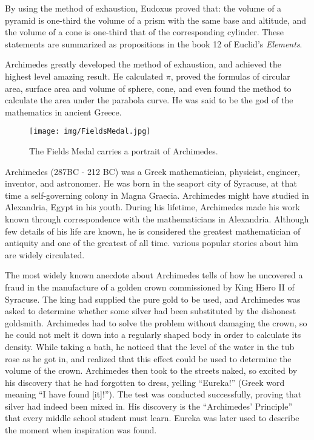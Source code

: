 \documentclass{article}
\begin{document}
By using the method of exhaustion, Eudoxus proved that: the volume of a pyramid is one-third the volume of a prism with the same base and altitude, and the volume of a cone is one-third that of the corresponding cylinder. These statements are summarized as propositions in the book 12 of Euclid's {\em Elements}\cite{HanXueTao16}.

Archimedes greatly developed the method of exhaustion, and achieved the highest level amazing result. He calculated $\pi$, proved the formulas of circular area, surface area and volume of sphere, cone, and even found the method to calculate the area under the parabola curve. He was said to be the god of the mathematics in ancient Greece.

\begin{wrapfigure}{R}{0.4\textwidth}
 \centering
 \texttt{[image: img/FieldsMedal.jpg]}
 \captionsetup{labelformat=empty}
 \caption{The Fields Medal carries a portrait of Archimedes.}
 \label{fig:FieldsMedal}
\end{wrapfigure}

Archimedes (287BC - 212 BC) was a Greek mathematician, physicist, engineer, inventor, and astronomer. He was born in the seaport city of Syracuse, at that time a self-governing colony in Magna Graecia. Archimedes might have studied in Alexandria, Egypt in his youth. During his lifetime, Archimedes made his work known through correspondence with the mathematicians in Alexandria. Although few details of his life are known, he is considered the greatest mathematician of antiquity and one of the greatest of all time. various popular stories about him are widely circulated.

The most widely known anecdote about Archimedes tells of how he uncovered a fraud in the manufacture of a golden crown commissioned by King Hiero II of Syracuse. The king had supplied the pure gold to be used, and Archimedes was asked to determine whether some silver had been substituted by the dishonest goldsmith. Archimedes had to solve the problem without damaging the crown, so he could not melt it down into a regularly shaped body in order to calculate its density. While taking a bath, he noticed that the level of the water in the tub rose as he got in, and realized that this effect could be used to determine the volume of the crown. Archimedes then took to the streets naked, so excited by his discovery that he had forgotten to dress, yelling ``Eureka!'' (Greek word meaning ``I have found [it]!''). The test was conducted successfully, proving that silver had indeed been mixed in. His discovery is the ``Archimedes' Principle'' that every middle school student must learn. Eureka was later used to describe the moment when inspiration was found.
\end{document}
